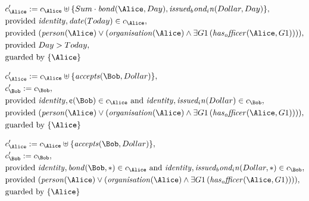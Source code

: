 \begin{align*}
&
c'_
{
\Alice
}
 := 
c_
{
\Alice
}
 \uplus 
\{
Sum
\cdot
\mathit{
bond
}
(
\Alice
,
Day
)
,
\mathit{
issued_bond_in
}
(
Dollar
,
Day
)
\}
,\\
&
\text{provided } 
\mathit{
identity
}
,
\mathit{
date
}
(
Today
)
 \in c_
{
\Alice
}
,\\
&
\text{provided } 
(
\mathit{
person
}
(
\Alice
)
\lor
(
\mathit{
organisation
}
(
\Alice
)
\land
\exists 
G1
\,(
\mathit{
has_officer
}
(
\Alice
,
G1
)
)
)
)
,\\
&
\text{provided } 
Day
>
Today
,\\
&
\text{guarded by } \{
\Alice
\}
\end{align*}

\begin{align*}
&
c'_
{
\Alice
}
 := 
c_
{
\Alice
}
 \uplus 
\{
\mathit{
accepts
}
(
\Bob
,
Dollar
)
\}
,\\
&
c'_
{
\Bob
}
 := 
c_
{
\Bob
}
,\\
&
\text{provided } 
\mathit{
identity
}
,
\text{\textcent}
(
\Bob
)
 \in c_
{
\Alice
}
 \text{ and } 
\mathit{
identity
}
,
\mathit{
issued_in
}
(
Dollar
)
 \in c_
{
\Bob
}
,\\
&
\text{provided } 
(
\mathit{
person
}
(
\Alice
)
\lor
(
\mathit{
organisation
}
(
\Alice
)
\land
\exists 
G1
\,(
\mathit{
has_officer
}
(
\Alice
,
G1
)
)
)
)
,\\
&
\text{guarded by } \{
\Alice
\}
\end{align*}

\begin{align*}
&
c'_
{
\Alice
}
 := 
c_
{
\Alice
}
 \uplus 
\{
\mathit{
accepts
}
(
\Bob
,
Dollar
)
\}
,\\
&
c'_
{
\Bob
}
 := 
c_
{
\Bob
}
,\\
&
\text{provided } 
\mathit{
identity
}
,
\mathit{
bond
}
(
\Bob
,
\ast
)
 \in c_
{
\Alice
}
 \text{ and } 
\mathit{
identity
}
,
\mathit{
issued_bond_in
}
(
Dollar
,
\ast
)
 \in c_
{
\Bob
}
,\\
&
\text{provided } 
(
\mathit{
person
}
(
\Alice
)
\lor
(
\mathit{
organisation
}
(
\Alice
)
\land
\exists 
G1
\,(
\mathit{
has_officer
}
(
\Alice
,
G1
)
)
)
)
,\\
&
\text{guarded by } \{
\Alice
\}
\end{align*}

